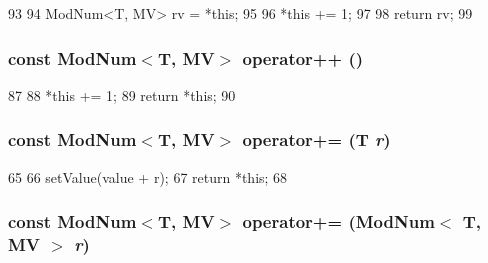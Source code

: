 \begin{DoxyCode}
93                                         {
94         ModNum<T, MV> rv = *this;
95 
96         *this += 1;
97 
98         return rv;
99     }
\end{DoxyCode}
\hypertarget{classModNum_a7948d9ce22cac88f035a1f54e4f0d538}{
\subsubsection[{operator++}]{\setlength{\rightskip}{0pt plus 5cm}const {\bf ModNum}$<$T, MV$>$ operator++ ()}}
\label{classModNum_a7948d9ce22cac88f035a1f54e4f0d538}



\begin{DoxyCode}
87                                      {
88         *this += 1;
89         return *this;
90     }
\end{DoxyCode}
\hypertarget{classModNum_a2f36d8f08eefc54772770f0593a7c07e}{
\subsubsection[{operator+=}]{\setlength{\rightskip}{0pt plus 5cm}const {\bf ModNum}$<$T, MV$>$ operator+= (T {\em r})}}
\label{classModNum_a2f36d8f08eefc54772770f0593a7c07e}



\begin{DoxyCode}
65                                         {
66         setValue(value + r);
67         return *this;
68     }
\end{DoxyCode}
\hypertarget{classModNum_a82c9860a23c00bc0d2450c89fc1555f6}{
\subsubsection[{operator+=}]{\setlength{\rightskip}{0pt plus 5cm}const {\bf ModNum}$<$T, MV$>$ operator+= ({\bf ModNum}$<$ T, MV $>$ {\em r})}}
\label{classModNum_a82c9860a23c00bc0d2450c89fc1555f6}




